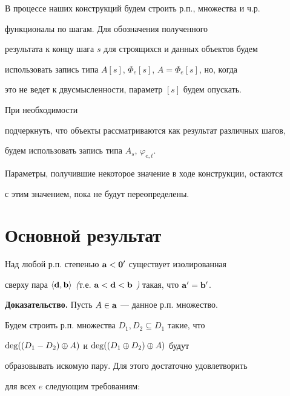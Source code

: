 В процессе наших конструкций будем строить р.п., \pp множества и ч.р.


функционалы по шагам. Для обозначения полученного


результата к концу шага $s$ для строящихся и данных объектов будем 


использовать запись типа $A[s]$, $\Phi_e[s]$, $A=\Phi_e [s]$, но, когда


это не ведет к двусмысленности, параметр $[s]$ будем опускать.


При необходимости


подчеркнуть, что объекты рассматриваются как результат различных шагов,


будем использовать запись типа $A_s$, $\varphi_{e,t}$.


Параметры, получившие некоторое значение в ходе конструкции, остаются 


с этим значением, пока не будут переопределены. 





\section{Основной результат}


 


\begin{thm}\label{iso}


Над любой р.п. степенью ${\bold a}<{\bold 0^\prime}$ существует изолированная


сверху пара $\langle\dg{d},\dg{b}\rangle$ {\em (}т.е. $\dg{a}<


\dg{d}<\dg{b}$ {\em )} такая, что $\sk{a}=\sk{b}$.


\end{thm}





{\bf Доказательство.} Пусть $A\in{\bold a}$ --- данное р.п. множество.


Будем строить р.п. множества $D_1,D_2\subseteq D_1$ такие, что


$\deg((D_1-D_2)\oplus A)$ и $\deg((D_1\oplus D_2)\oplus A)$ будут


образовывать искомую пару. Для этого достаточно удовлетворить


для всех $e$ следующим требованиям:


